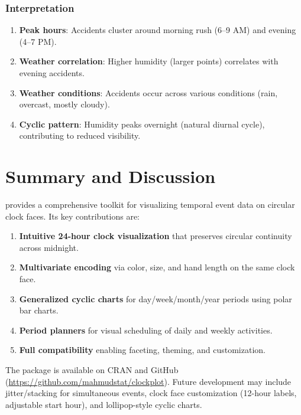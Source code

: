 \documentclass[article]{jss}
\begin{document}
\subsubsection*{Interpretation}
\begin{enumerate}
\item \textbf{Peak hours}: Accidents cluster around morning rush (6--9 AM) and evening (4--7 PM).
\item \textbf{Weather correlation}: Higher humidity (larger points) correlates with evening accidents.
\item \textbf{Weather conditions}: Accidents occur across various conditions (rain, overcast, mostly cloudy).
\item \textbf{Cyclic pattern}: Humidity peaks overnight (natural diurnal cycle), contributing to reduced visibility.
\end{enumerate}



\section{Summary and Discussion} \label{sec:summary}

 provides a comprehensive toolkit for visualizing temporal event data on circular clock faces. Its key contributions are:

\begin{enumerate}
\item \textbf{Intuitive 24-hour clock visualization} that preserves circular continuity across midnight.
\item \textbf{Multivariate encoding} via color, size, and hand length on the same clock face.
\item \textbf{Generalized cyclic charts} for day/week/month/year periods using polar bar charts.
\item \textbf{Period planners} for visual scheduling of daily and weekly activities.
\item \textbf{Full  compatibility} enabling faceting, theming, and customization.
\end{enumerate}

The package is available on CRAN and GitHub (\url{https://github.com/mahmudstat/clockplot}). Future development may include jitter/stacking for simultaneous events, clock face customization (12-hour labels, adjustable start hour), and lollipop-style cyclic charts.
\end{document}
